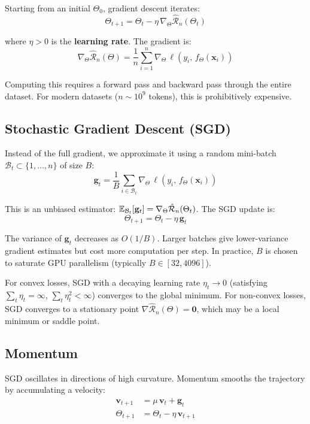 \documentclass[main.tex]{subfiles}
\begin{document}
Starting from an initial $\Theta_0$, gradient descent iterates:
$$\Theta_{t+1} = \Theta_t - \eta\,\nabla_\Theta \hat{\mathcal{R}}_n(\Theta_t)$$

where $\eta > 0$ is the \textbf{learning rate}. The gradient is:
$$\nabla_\Theta \hat{\mathcal{R}}_n(\Theta) = \frac{1}{n}\sum_{i=1}^{n}\nabla_\Theta\,\ell\!\left(y_i,\, f_\Theta(\mathbf{x}_i)\right)$$

Computing this requires a forward pass and backward pass through the entire dataset. For modern datasets ($n \sim 10^9$ tokens), this is prohibitively expensive.

\subsection{Stochastic Gradient Descent (SGD)}

Instead of the full gradient, we approximate it using a random mini-batch $\mathcal{B}_t \subset \{1, \ldots, n\}$ of size $B$:
$$\mathbf{g}_t = \frac{1}{B}\sum_{i \in \mathcal{B}_t}\nabla_\Theta\,\ell\!\left(y_i,\, f_\Theta(\mathbf{x}_i)\right)$$

This is an unbiased estimator: $\mathbb{E}_{\mathcal{B}_t}[\mathbf{g}_t] = \nabla_\Theta \hat{\mathcal{R}}_n(\Theta_t)$. The SGD update is:
$$\Theta_{t+1} = \Theta_t - \eta\,\mathbf{g}_t$$

The variance of $\mathbf{g}_t$ decreases as $O(1/B)$. Larger batches give lower-variance gradient estimates but cost more computation per step. In practice, $B$ is chosen to saturate GPU parallelism (typically $B \in [32, 4096]$).

\begin{remark}
For convex losses, SGD with a decaying learning rate $\eta_t \to 0$ (satisfying $\sum_t \eta_t = \infty$, $\sum_t \eta_t^2 < \infty$) converges to the global minimum. For non-convex losses, SGD converges to a stationary point $\nabla \hat{\mathcal{R}}_n(\Theta) = \mathbf{0}$, which may be a local minimum or saddle point.
\end{remark}

\subsection{Momentum}

SGD oscillates in directions of high curvature. Momentum smooths the trajectory by accumulating a velocity:
\begin{align}
\mathbf{v}_{t+1} &= \mu\,\mathbf{v}_t + \mathbf{g}_t \\[4pt]
\Theta_{t+1} &= \Theta_t - \eta\,\mathbf{v}_{t+1}
\end{align}
\end{document}
